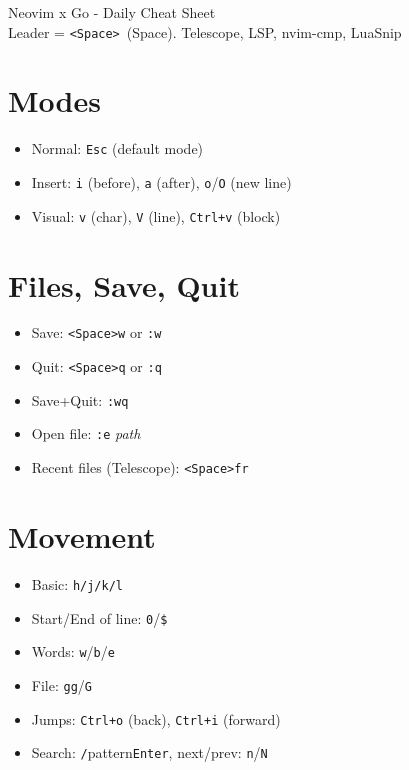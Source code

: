 \documentclass[9pt,twocolumn]{extarticle}
\newcommand{\key}[1]{\mbox{\texttt{#1}}}
\newcommand{\leader}{\key{<Space>}} %
\begin{document}
\begin{center}
{\LARGE Neovim x Go - Daily Cheat Sheet}\\
{\small Leader = \leader\ (Space). Telescope, LSP, nvim-cmp, LuaSnip}
\end{center}

\section{Modes}
\begin{itemize}
  \item Normal: \key{Esc} (default mode)
  \item Insert: \key{i} (before), \key{a} (after), \key{o}/\key{O} (new line)
  \item Visual: \key{v} (char), \key{V} (line), \key{Ctrl+v} (block)
\end{itemize}

\section{Files, Save, Quit}
\begin{itemize}
  \item Save: \leader\key{w} or \key{:w}
  \item Quit: \leader\key{q} or \key{:q}
  \item Save+Quit: \key{:wq}
  \item Open file: \key{:e} \emph{path}
  \item Recent files (Telescope): \leader\key{fr}
\end{itemize}

\section{Movement}
\begin{itemize}
  \item Basic: \key{h/j/k/l}
  \item Start/End of line: \key{0}/\key{\$}
  \item Words: \key{w}/\key{b}/\key{e}
  \item File: \key{gg}/\key{G}
  \item Jumps: \key{Ctrl+o} (back), \key{Ctrl+i} (forward)
  \item Search: \key{/}pattern\key{Enter}, next/prev: \key{n}/\key{N}
\end{itemize}
\end{document}

